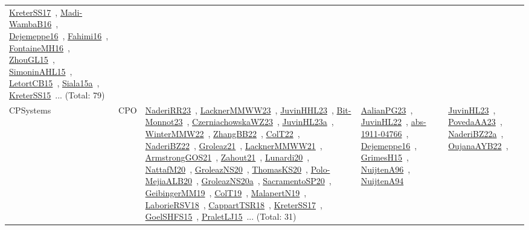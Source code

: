 {\begin{longtable}{lp{3cm}>{\raggedright\arraybackslash}p{6cm}>{\raggedright\arraybackslash}p{6cm}>{\raggedright\arraybackslash}p{8cm}}
\href{works/KreterSS17.pdf}{KreterSS17}~\cite{KreterSS17}, \href{works/Madi-WambaB16.pdf}{Madi-WambaB16}~\cite{Madi-WambaB16}, \href{works/Dejemeppe16.pdf}{Dejemeppe16}~\cite{Dejemeppe16}, \href{works/Fahimi16.pdf}{Fahimi16}~\cite{Fahimi16}, \href{works/FontaineMH16.pdf}{FontaineMH16}~\cite{FontaineMH16}, \href{works/ZhouGL15.pdf}{ZhouGL15}~\cite{ZhouGL15}, \href{works/SimoninAHL15.pdf}{SimoninAHL15}~\cite{SimoninAHL15}, \href{works/LetortCB15.pdf}{LetortCB15}~\cite{LetortCB15}, \href{works/Siala15a.pdf}{Siala15a}~\cite{Siala15a}, \href{works/KreterSS15.pdf}{KreterSS15}~\cite{KreterSS15}... (Total: 79)\\
CPSystems & CPO & \href{works/NaderiRR23.pdf}{NaderiRR23}~\cite{NaderiRR23}, \href{works/LacknerMMWW23.pdf}{LacknerMMWW23}~\cite{LacknerMMWW23}, \href{works/JuvinHHL23.pdf}{JuvinHHL23}~\cite{JuvinHHL23}, \href{works/Bit-Monnot23.pdf}{Bit-Monnot23}~\cite{Bit-Monnot23}, \href{works/CzerniachowskaWZ23.pdf}{CzerniachowskaWZ23}~\cite{CzerniachowskaWZ23}, \href{works/JuvinHL23a.pdf}{JuvinHL23a}~\cite{JuvinHL23a}, \href{works/WinterMMW22.pdf}{WinterMMW22}~\cite{WinterMMW22}, \href{works/ZhangBB22.pdf}{ZhangBB22}~\cite{ZhangBB22}, \href{works/ColT22.pdf}{ColT22}~\cite{ColT22}, \href{works/NaderiBZ22.pdf}{NaderiBZ22}~\cite{NaderiBZ22}, \href{works/Groleaz21.pdf}{Groleaz21}~\cite{Groleaz21}, \href{works/LacknerMMWW21.pdf}{LacknerMMWW21}~\cite{LacknerMMWW21}, \href{works/ArmstrongGOS21.pdf}{ArmstrongGOS21}~\cite{ArmstrongGOS21}, \href{works/Zahout21.pdf}{Zahout21}~\cite{Zahout21}, \href{works/Lunardi20.pdf}{Lunardi20}~\cite{Lunardi20}, \href{works/NattafM20.pdf}{NattafM20}~\cite{NattafM20}, \href{works/GroleazNS20.pdf}{GroleazNS20}~\cite{GroleazNS20}, \href{works/ThomasKS20.pdf}{ThomasKS20}~\cite{ThomasKS20}, \href{works/Polo-MejiaALB20.pdf}{Polo-MejiaALB20}~\cite{Polo-MejiaALB20}, \href{works/GroleazNS20a.pdf}{GroleazNS20a}~\cite{GroleazNS20a}, \href{works/SacramentoSP20.pdf}{SacramentoSP20}~\cite{SacramentoSP20}, \href{works/GeibingerMM19.pdf}{GeibingerMM19}~\cite{GeibingerMM19}, \href{works/ColT19.pdf}{ColT19}~\cite{ColT19}, \href{works/MalapertN19.pdf}{MalapertN19}~\cite{MalapertN19}, \href{works/LaborieRSV18.pdf}{LaborieRSV18}~\cite{LaborieRSV18}, \href{works/CappartTSR18.pdf}{CappartTSR18}~\cite{CappartTSR18}, \href{works/KreterSS17.pdf}{KreterSS17}~\cite{KreterSS17}, \href{works/GoelSHFS15.pdf}{GoelSHFS15}~\cite{GoelSHFS15}, \href{works/PraletLJ15.pdf}{PraletLJ15}~\cite{PraletLJ15}... (Total: 31) & \href{works/AalianPG23.pdf}{AalianPG23}~\cite{AalianPG23}, \href{works/JuvinHL22.pdf}{JuvinHL22}~\cite{JuvinHL22}, \href{works/abs-1911-04766.pdf}{abs-1911-04766}~\cite{abs-1911-04766}, \href{works/Dejemeppe16.pdf}{Dejemeppe16}~\cite{Dejemeppe16}, \href{works/GrimesH15.pdf}{GrimesH15}~\cite{GrimesH15}, \href{works/NuijtenA96.pdf}{NuijtenA96}~\cite{NuijtenA96}, \href{works/NuijtenA94.pdf}{NuijtenA94}~\cite{NuijtenA94} & \href{works/JuvinHL23.pdf}{JuvinHL23}~\cite{JuvinHL23}, \href{works/PovedaAA23.pdf}{PovedaAA23}~\cite{PovedaAA23}, \href{works/NaderiBZ22a.pdf}{NaderiBZ22a}~\cite{NaderiBZ22a}, \href{works/OujanaAYB22.pdf}{OujanaAYB22}~\cite{OujanaAYB22}, 
\end{longtable}}
